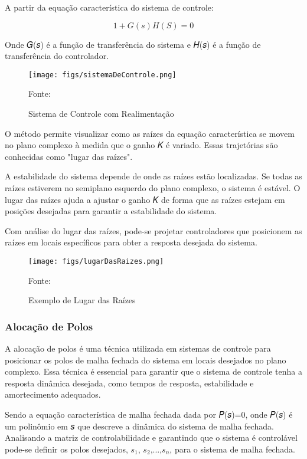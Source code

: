 A partir da equação característica do sistema de controle:

\begin{equation}
	1+G(s)H(S)=0
\end{equation}

Onde 𝐺(𝑠) é a função de transferência do sistema e 𝐻(𝑠) é a função de transferência do controlador.

\begin{figure}[htpb]
	\centering
	\texttt{[image: figs/sistemaDeControle.png]}
	\caption{Sistema de Controle com Realimentação}
	{Fonte: \cite[p.~247]{ogata2011engenharia}}
	\label{fig:15}
\end{figure}

O método permite visualizar como as raízes da equação característica se movem no plano complexo à medida que o ganho 𝐾 é variado. Essas trajetórias são conhecidas como "lugar das raízes".

A estabilidade do sistema depende de onde as raízes estão localizadas. Se todas as raízes estiverem no semiplano esquerdo do plano complexo, o sistema é estável. O lugar das raízes ajuda a ajustar o ganho 𝐾 de forma que as raízes estejam em posições desejadas para garantir a estabilidade do sistema.

Com análise do lugar das raízes, pode-se projetar controladores que posicionem as raízes em locais específicos para obter a resposta desejada do sistema.

\begin{figure}[htpb]
	\centering
	\texttt{[image: figs/lugarDasRaizes.png]}
	\caption{Exemplo de Lugar das Raízes}
	{Fonte: \cite[p.~264]{ogata2011engenharia}}
	\label{fig:15}
\end{figure}
	
\subsubsection{Alocação de Polos}

A alocação de polos é uma técnica utilizada em sistemas de controle para posicionar os polos de malha fechada do sistema em locais desejados no plano complexo. Essa técnica é essencial para garantir que o sistema de controle tenha a resposta dinâmica desejada, como tempos de resposta, estabilidade e amortecimento adequados.

Sendo a equação característica de malha fechada dada por 𝑃(𝑠)=0, onde 𝑃(𝑠) é um polinômio em 𝑠 que descreve a dinâmica do sistema de malha fechada. Analisando a matriz de controlabilidade e garantindo que o sistema é controlável pode-se definir os polos desejados, $𝑠_1$, $𝑠_2$,...,$𝑠_n$, para o sistema de malha fechada.

